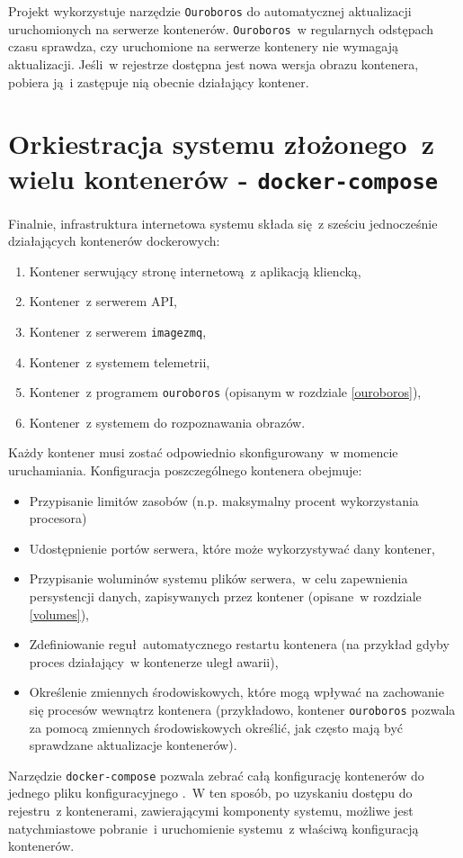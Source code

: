 Projekt wykorzystuje narzędzie \texttt{Ouroboros} do automatycznej aktualizacji
uruchomionych na serwerze kontenerów. \texttt{Ouroboros}~w regularnych odstępach
czasu sprawdza, czy uruchomione na serwerze kontenery nie wymagają aktualizacji.
Jeśli~w rejestrze dostępna jest nowa wersja obrazu kontenera, pobiera ją~i zastępuje
nią obecnie działający kontener.

\section{Orkiestracja systemu złożonego~z wielu kontenerów - \texttt{docker-compose}}

Finalnie, infrastruktura internetowa systemu składa się~z sześciu
jednocześnie działających kontenerów dockerowych:

\begin{enumerate}
  \item Kontener serwujący stronę internetową~z aplikacją kliencką,
  \item Kontener~z serwerem API,
  \item Kontener~z serwerem \texttt{imagezmq},
  \item Kontener~z systemem telemetrii,
  \item Kontener~z programem \texttt{ouroboros} (opisanym w rozdziale \ref{ouroboros}),
  \item Kontener~z systemem do rozpoznawania obrazów. 
\end{enumerate}

\noindent
Każdy kontener musi zostać odpowiednio skonfigurowany~w momencie uruchamiania.
Konfiguracja poszczególnego kontenera obejmuje:

\begin{itemize}
  \item Przypisanie limitów zasobów (n.p. maksymalny procent wykorzystania procesora)
  \item Udostępnienie portów serwera, które może wykorzystywać dany kontener,
  \item Przypisanie woluminów systemu plików serwera,~w celu zapewnienia persystencji
        danych, zapisywanych przez kontener (opisane~w rozdziale \ref{volumes}),
  \item Zdefiniowanie reguł automatycznego restartu kontenera (na przykład gdyby proces
        działający~w kontenerze uległ awarii),
  \item Określenie zmiennych środowiskowych, które mogą wpływać na zachowanie się
        procesów wewnątrz kontenera (przykładowo, kontener \texttt{ouroboros} pozwala
        za pomocą zmiennych środowiskowych określić, jak często mają być sprawdzane
        aktualizacje kontenerów).
\end{itemize}

Narzędzie \texttt{docker-compose} pozwala zebrać całą konfigurację kontenerów do 
jednego pliku konfiguracyjnego \cite{docker_compose}.~W ten sposób, po uzyskaniu
dostępu do rejestru~z kontenerami, zawierającymi komponenty systemu, możliwe jest
natychmiastowe pobranie~i uruchomienie systemu~z właściwą konfiguracją kontenerów.

